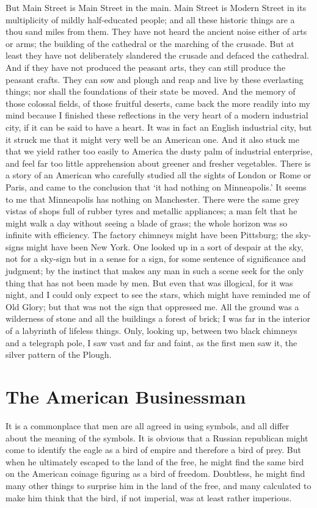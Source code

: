 \documentclass{book}
\begin{document}
But Main Street is Main Street in the main. Main Street is Modern Street in its multiplicity of mildly half-educated people; and all these historic things are a thou sand miles from them. They have not heard the ancient noise either of arts or arms; the building of the cathedral or the marching of the crusade. But at least they have not deliberately slandered the crusade and defaced the cathedral. And if they have not produced the peasant arts, they can still produce the peasant crafts. They can sow and plough and reap and live by these everlasting things; nor shall the foundations of their state be moved. And the memory of those colossal fields, of those fruitful deserts, came back the more readily into my mind because I finished these reflections in the very heart of a modern industrial city, if it can be said to have a heart. It was in fact an English industrial city, but it struck me that it might very well be an American one. And it also stuck me that we yield rather too easily to America the dusty palm of industrial enterprise, and feel far too little apprehension about greener and fresher vegetables. There is a story of an American who carefully studied all the sights of London or Rome or Paris, and came to the conclusion that ‘it had nothing on Minneapolis.’ It seems to me that Minneapolis has nothing on Manchester. There were the same grey vistas of shops full of rubber tyres and metallic appliances; a man felt that he might walk a day without seeing a blade of grass; the whole horizon was so infinite with efficiency. The factory chimneys might have been Pittsburg; the sky-signs might have been New York. One looked up in a sort of despair at the sky, not for a sky-sign but in a sense for a sign, for some sentence of significance and judgment; by the instinct that makes any man in such a scene seek for the only thing that has not been made by men. But even that was illogical, for it was night, and I could only expect to see the stars, which might have reminded me of Old Glory; but that was not the sign that oppressed me. All the ground was a wilderness of stone and all the buildings a forest of brick; I was far in the interior of a labyrinth of lifeless things. Only, looking up, between two black chimneys and a telegraph pole, I saw vast and far and faint, as the first men saw it, the silver pattern of the Plough.

\chapter{The American Businessman}
\label{chapter-6}
It is a commonplace that men are all agreed in using symbols, and all differ about the meaning of the symbols. It is obvious that a Russian republican might come to identify the eagle as a bird of empire and therefore a bird of prey. But when he ultimately escaped to the land of the free, he might find the same bird on the American coinage figuring as a bird of freedom. Doubtless, he might find many other things to surprise him in the land of the free, and many calculated to make him think that the bird, if not imperial, was at least rather imperious.
\end{document}
